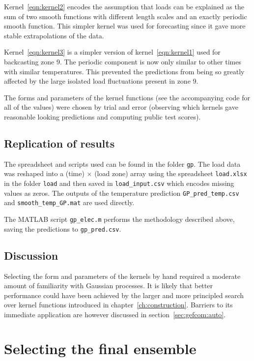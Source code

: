 Kernel~\eqref{eqn:kernel2} encodes the assumption that loads can be explained as the sum of two smooth functions with different length scales and an exactly periodic smooth function.
This simpler kernel was used for forecasting since it gave more stable extrapolations of the data.

Kernel~\eqref{eqn:kernel3} is a simpler version of kernel~\eqref{eqn:kernel1} used for backcasting zone 9.
The periodic component is now only similar to other times with similar temperatures.
This prevented the predictions from being so greatly affected by the large isolated load fluctuations present in zone 9.

The forms and parameters of the kernel functions (see the accompanying code for all of the values) were chosen by trial and error (observing which kernels gave reasonable looking predictions and computing public test scores).

\subsection{Replication of results}

The spreadsheet and scripts used can be found in the folder \texttt{gp}.
The load data was reshaped into a (time) $\times$ (load zone) array using the spreadsheet \texttt{load.xlsx} in the folder \texttt{load} and then saved in \texttt{load\_input.csv} which encodes missing values as zeros.
The outputs of the temperature prediction \texttt{GP\_pred\_temp.csv} and \texttt{smooth\_temp\_GP.mat} are used directly.

The MATLAB script \texttt{gp\_elec.m} performs the methodology described above, saving the predictions to \texttt{gp\_pred.csv}.

\subsection{Discussion}

Selecting the form and parameters of the kernels by hand required a moderate amount of familiarity with Gaussian processes.
It is likely that better performance could have been achieved by the larger and more principled search over kernel functions introduced in chapter~\ref{ch:construction}.
Barriers to its immediate application are however discussed in section~\ref{sec:gefcom:auto}.

\section{Selecting the final ensemble}

